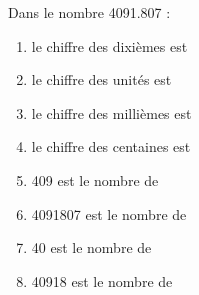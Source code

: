 \begin{exercice}
    Dans le nombre \num{4 091.807} :
       \begin{enumerate}
          \item le chiffre des dixièmes est \dotfill\smallskip
          \item le chiffre des unités est \dotfill\smallskip
          \item le chiffre des millièmes est \dotfill\smallskip
          \item le chiffre des centaines est \dotfill\smallskip
          \item \num{409} est le nombre de \dotfill\smallskip
          \item \num{4 091 807} est le nombre de \dotfill\smallskip
          \item \num{40} est le nombre de \dotfill\smallskip
          \item \num{40 918} est le nombre de \dotfill
       \end{enumerate}
\end{exercice}
